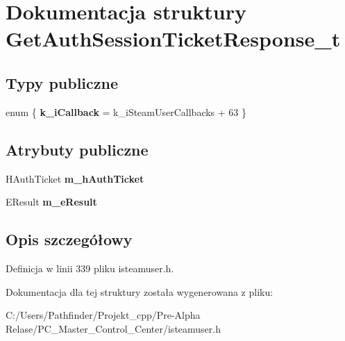 \hypertarget{struct_get_auth_session_ticket_response__t}{}\section{Dokumentacja struktury Get\+Auth\+Session\+Ticket\+Response\+\_\+t}
\label{struct_get_auth_session_ticket_response__t}
\subsection*{Typy publiczne}
\begin{DoxyCompactItemize}
\item 
\mbox{\label{struct_get_auth_session_ticket_response__t_ac441206c77786cf28a9faeca5b6bfa2e}} 
enum \{ {\bfseries k\+\_\+i\+Callback} = k\+\_\+i\+Steam\+User\+Callbacks + 63
 \}
\end{DoxyCompactItemize}
\subsection*{Atrybuty publiczne}
\begin{DoxyCompactItemize}
\item 
\mbox{\label{struct_get_auth_session_ticket_response__t_acdb83244467842eabc2b6e540dcbaa64}} 
H\+Auth\+Ticket {\bfseries m\+\_\+h\+Auth\+Ticket}
\item 
\mbox{\label{struct_get_auth_session_ticket_response__t_a7a87eea494881b548c3b46847f3896e0}} 
E\+Result {\bfseries m\+\_\+e\+Result}
\end{DoxyCompactItemize}


\subsection{Opis szczegółowy}


Definicja w linii 339 pliku isteamuser.\+h.



Dokumentacja dla tej struktury została wygenerowana z pliku\+:\begin{DoxyCompactItemize}
\item 
C\+:/\+Users/\+Pathfinder/\+Projekt\+\_\+cpp/\+Pre-\/\+Alpha Relase/\+P\+C\+\_\+\+Master\+\_\+\+Control\+\_\+\+Center/isteamuser.\+h\end{DoxyCompactItemize}
